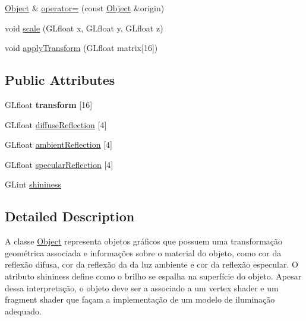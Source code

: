 \begin{DoxyCompactItemize}
\item 
\mbox{\hyperlink{classscene_1_1_object}{Object}} \& \mbox{\hyperlink{classscene_1_1_object_ad1368be6ce1cded380489daa281091b2}{operator=}} (const \mbox{\hyperlink{classscene_1_1_object}{Object}} \&origin)
\item 
void \mbox{\hyperlink{classscene_1_1_object_aaba38d02516dee8a67ed872de1be488b}{scale}} (G\+Lfloat x, G\+Lfloat y, G\+Lfloat z)
\item 
void \mbox{\hyperlink{classscene_1_1_object_a30b47bcd40234142c873a8ccef3d8d17}{apply\+Transform}} (G\+Lfloat matrix\mbox{[}16\mbox{]})
\end{DoxyCompactItemize}
\subsection*{Public Attributes}
\begin{DoxyCompactItemize}
\item 
\mbox{\label{classscene_1_1_object_af1083bb93cb845302ede74e1302d4695}} 
G\+Lfloat {\bfseries transform} \mbox{[}16\mbox{]}
\item 
G\+Lfloat \mbox{\hyperlink{classscene_1_1_object_a4608ddd5375279ce31e1da48e9963759}{diffuse\+Reflection}} \mbox{[}4\mbox{]}
\item 
G\+Lfloat \mbox{\hyperlink{classscene_1_1_object_a25c68d682b3620b0257f59db215ffe23}{ambient\+Reflection}} \mbox{[}4\mbox{]}
\item 
G\+Lfloat \mbox{\hyperlink{classscene_1_1_object_ae584bfd42e862d486b31567c3f996773}{specular\+Reflection}} \mbox{[}4\mbox{]}
\item 
G\+Lint \mbox{\hyperlink{classscene_1_1_object_ad0d064fc3da95f59e0fea3a39122e9c5}{shininess}}
\end{DoxyCompactItemize}


\subsection{Detailed Description}
A classe \mbox{\hyperlink{classscene_1_1_object}{Object}} representa objetos gráficos que possuem uma transformação geométrica associada e informações sobre o material do objeto, como cor da reflexão difusa, cor da reflexão da da luz ambiente e cor da reflexão especular. O atributo shininess define como o brilho se espalha na superfície do objeto. Apesar dessa interpretação, o objeto deve ser a associado a um vertex shader e um fragment shader que façam a implementação de um modelo de iluminação adequado. 

